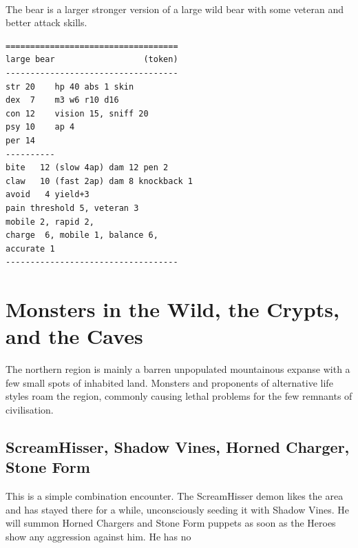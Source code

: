 \

\noindent
The bear is a larger stronger version of a large wild bear with some veteran and better attack skills.
\begin{samepage} \small \begin{verbatim}
===================================
large bear                  (token)
-----------------------------------
str 20    hp 40 abs 1 skin
dex  7    m3 w6 r10 d16
con 12    vision 15, sniff 20
psy 10    ap 4
per 14
----------
bite   12 (slow 4ap) dam 12 pen 2
claw   10 (fast 2ap) dam 8 knockback 1
avoid   4 yield+3
pain threshold 5, veteran 3
mobile 2, rapid 2,
charge  6, mobile 1, balance 6,
accurate 1
-----------------------------------
\end{verbatim} \normalsize \end{samepage}













\clearpage
{}
\section*{Monsters in the Wild, the Crypts, and the Caves}
The northern region is mainly a barren unpopulated mountainous expanse with a few small spots of inhabited land. Monsters and proponents of alternative life styles roam the region, commonly causing lethal problems for the few remnants of civilisation.











\goodbreak
{}
\subsection*{ScreamHisser, Shadow Vines, Horned Charger, Stone Form}
\label{sec:screamhisserstats}
This is a simple combination encounter. The ScreamHisser demon likes the area and has stayed there for a while, unconsciously seeding it with Shadow Vines. He will summon Horned Chargers and Stone Form puppets as soon as the Heroes show any aggression against him. He has no


